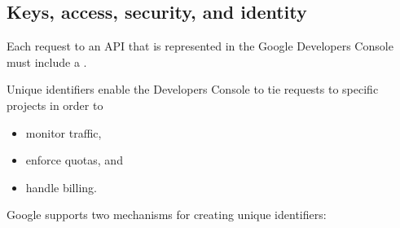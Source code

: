 %
%
%
%
\subsection{Keys, access, security, and identity}

Each request to an API that is represented in the Google Developers
Console must include a . 

Unique identifiers enable
the Developers Console to tie requests to specific projects in order to
\begin{itemize}
\item
monitor traffic, 
\item
enforce quotas, and 
\item
handle billing.
\end{itemize}

Google supports two mechanisms for creating unique identifiers:

